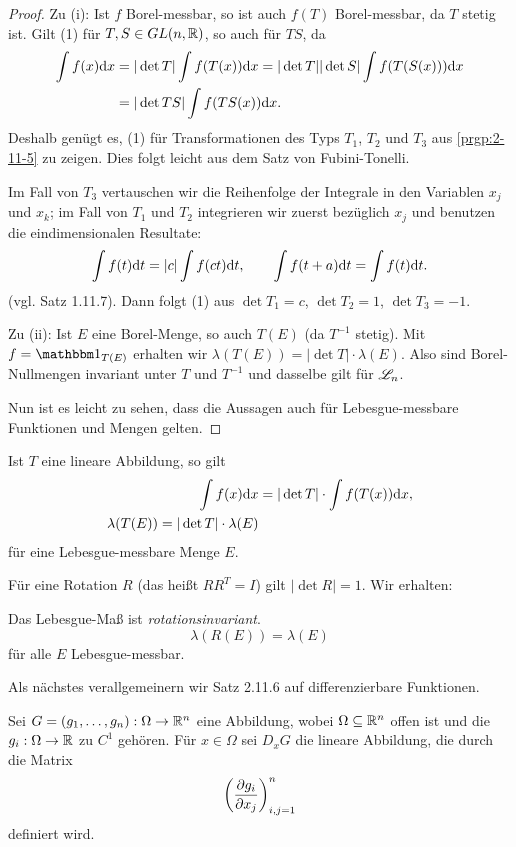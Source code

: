 \begin{proof}
  Zu (i): Ist $f$ Borel-messbar, so ist auch $f(T)$ Borel-messbar, da $T$ stetig
  ist. Gilt (1) für $T, S \in GL(n,\mathbb{R})$, so auch für $TS$, da
  \[ \begin{aligned}
      \int f(x) \mathrm{d} x
    &= |\det T| \int f(T(x))\mathrm{d} x = |\det T||\det S| \int f(T(S(x)))
    \mathrm{d} x \\
    &= | \det TS |\int f(TS(x)) \mathrm{d} x.
  \end{aligned} \]
  Deshalb genügt es, (1) für Transformationen des Typs $T_1$, $T_2$ und $T_3$
  aus \ref{prgp:2-11-5} zu zeigen. Dies folgt leicht aus dem Satz von Fubini-Tonelli.

  Im Fall von $T_3$ vertauschen wir die Reihenfolge der Integrale in den
  Variablen $x_j$ und $x_k$; im Fall von $T_1$ und $T_2$ integrieren wir zuerst
  bezüglich $x_j$ und benutzen die eindimensionalen Resultate:
  \[ \int f(t) \mathrm{d} t = | c | \int f(ct) \mathrm{d} t, \qquad \int
    f(t+a)\mathrm{d} t = \int f(t) \mathrm{d} t. \]
  (vgl. Satz 1.11.7). Dann folgt (1) aus $\det T_1= c$, $\det T_2 = 1$, $\det
  T_3 = -1$.

  Zu (ii): Ist $E$ eine Borel-Menge, so auch $T(E)$ (da $T^{-1}$ stetig). Mit
  $f=\ind_{T(E)}$ erhalten wir $\lambda (T(E)) = | \det T | \cdot \lambda(E)$.
  Also sind Borel-Nullmengen invariant unter $T$ und $T^{-1}$ und dasselbe gilt
  für $\mathscr{L}_n$.

  Nun ist es leicht zu sehen, dass die Aussagen auch für Lebesgue-messbare
  Funktionen und Mengen gelten.
\end{proof}

Ist $T$ eine lineare Abbildung, so gilt
\[ \begin{aligned}
    \int f(x) \mathrm{d} x &= | \det T | \cdot \int f(T(x)) \mathrm{d} x, \\
    \lambda(T(E)) = |\det T| \cdot \lambda(E)
  \end{aligned} \]
für eine Lebesgue-messbare Menge $E$.

Für eine Rotation $R$ (das heißt $RR^T = I$) gilt $|\det R| = 1$. Wir erhalten:
\begin{folg}
  Das Lebesgue-Maß ist \emph{rotationsinvariant}.
  \[ \lambda (R(E)) = \lambda(E) \]
  für alle $E$ Lebesgue-messbar.
\end{folg}

Als nächstes verallgemeinern wir Satz 2.11.6 auf differenzierbare Funktionen.
\begin{defn}
  Sei $G = (g_1, \ldots, g_n):\Omega \to \mathbb{R}^n$ eine Abbildung, wobei $\Omega
  \subseteq \mathbb{R}^n$ offen ist und die $g_i: \Omega \to \mathbb{R}$ zu $C^1$ gehören.
  Für $x \in \Omega$ sei $D_x G$ die lineare Abbildung, die durch die Matrix
  \[ \left(  \frac{\partial g_i}{\partial x_j} \right)^n_{i,j=1} \]
  definiert wird.
\end{defn}

